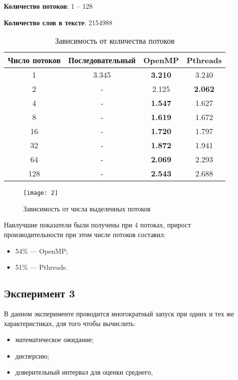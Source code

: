 \textbf{Количество потоков}: 1 -- 128

\textbf{Количество слов в тексте}: 2154988

\begin{table}[H]
	\centering
	\begin{tabular}{|c|c|c|c|}
		\hline
		Число потоков & Последовательный & OpenMP & Pthreads \\ \hline
		1   & 3.345            & \textbf{3.210}   & 3.240     \\ \hline
		2   & -                & 2.125  & \textbf{2.062}    \\ \hline
		4   & -                & \textbf{1.547}  & 1.627    \\ \hline
		8   & -                & \textbf{1.619}  & 1.672    \\ \hline
		16  & -                & \textbf{1.720}   & 1.797    \\ \hline
		32  & -                & \textbf{1.872}  & 1.941    \\ \hline
		64  & -                & \textbf{2.069}  & 2.293    \\ \hline
		128 & -                & \textbf{2.543}  & 2.688    \\
		\hline
	\end{tabular}
	\caption{Зависимость от количества потоков}
	\label{tab:threadchange}
\end{table}

\begin{figure}[H]
	\centering
	\texttt{[image: 2]}
	\caption{Зависимость от числа выделенных потоков}
	\label{pic:threadchange}
\end{figure}

Наилучшие показатели были получены при 4 потоках, прирост производительности при этом числе потоков составил:
\begin{itemize}
\item 54\% --- OpenMP;
\item 51\% --- Pthreads.
\end{itemize}

\subsection{Эксперимент 3}

В данном эксперименте проводится многократный запуск при одних и тех же характеристиках, для того чтобы вычислить:

\begin{itemize}
	\item математическое ожидание;
	\item дисперсию;
	\item доверительный интервал для оценки среднего,
\end{itemize}

